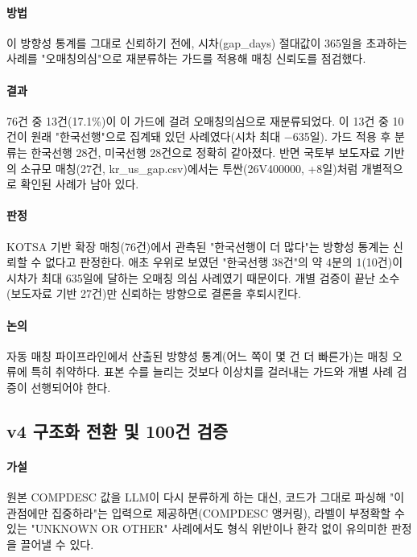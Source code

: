 \documentclass[11pt]{article}
\begin{document}
\paragraph{방법} 이 방향성 통계를 그대로 신뢰하기 전에, 시차(gap\_days) 절대값이 365일을 초과하는 사례를 "오매칭의심"으로 재분류하는 가드를 적용해 매칭 신뢰도를 점검했다.

\paragraph{결과} 76건 중 13건(17.1\%)이 이 가드에 걸려 오매칭의심으로 재분류되었다. 이 13건 중 10건이 원래 "한국선행"으로 집계돼 있던 사례였다(시차 최대 $-$635일). 가드 적용 후 분류는 한국선행 28건, 미국선행 28건으로 정확히 같아졌다.
반면 국토부 보도자료 기반의 소규모 매칭(27건, kr\_us\_gap.csv)에서는 투싼(26V400000, +8일)처럼 개별적으로 확인된 사례가 남아 있다.

\paragraph{판정} KOTSA 기반 확장 매칭(76건)에서 관측된 "한국선행이 더 많다"는 방향성 통계는 신뢰할 수 없다고 판정한다. 애초 우위로 보였던 "한국선행 38건"의 약 4분의 1(10건)이 시차가 최대 635일에 달하는 오매칭 의심 사례였기 때문이다. 개별 검증이 끝난 소수(보도자료 기반 27건)만 신뢰하는 방향으로 결론을 후퇴시킨다.

\paragraph{논의} 자동 매칭 파이프라인에서 산출된 방향성 통계(어느 쪽이 몇 건 더 빠른가)는 매칭 오류에 특히 취약하다. 표본 수를 늘리는 것보다 이상치를 걸러내는 가드와 개별 사례 검증이 선행되어야 한다.

\subsection{v4 구조화 전환 및 100건 검증}

\paragraph{가설} 원본 COMPDESC 값을 LLM이 다시 분류하게 하는 대신, 코드가 그대로 파싱해 "이 관점에만 집중하라"는 입력으로 제공하면(COMPDESC 앵커링), 라벨이 부정확할 수 있는 "UNKNOWN OR OTHER" 사례에서도 형식 위반이나 환각 없이 유의미한 판정을 끌어낼 수 있다.
\end{document}
